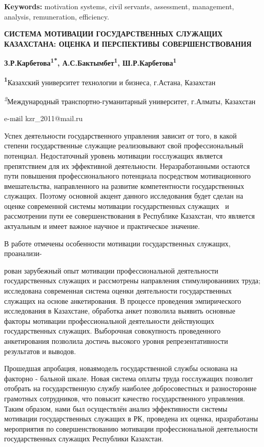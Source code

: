 {\bfseries Keywords:} motivation systems, civil servants, assessment,
management, analysis, remuneration, efficiency.

\begin{center}
{\large\bfseries СИСТЕМА МОТИВАЦИИ ГОСУДАРСТВЕННЫХ СЛУЖАЩИХ КАЗАХСТАНА: ОЦЕНКА И
ПЕРСПЕКТИВЫ СОВЕРШЕНСТВОВАНИЯ}

{\bfseries З.Р.Карбетова\textsuperscript{1*},
А.С.Бактымбет\textsuperscript{1}, Ш.Р.Карбетова\textsuperscript{1}}

{\bfseries \textsuperscript{1}}Казахский университет технологии и бизнеса,
г.Астана, Казахстан

\emph{\textsuperscript{2}}Международный транспортно-гуманитарный
университет, г.Алматы, Казахстан

e-mаil kzr\_2011@mail.ru
\end{center}

Успех деятельности государственного управления зависит от того, в какой
степени государственные служащие реализовывают свой профессиональный
потенциал. Недостаточный уровень мотивации госслужащих является
препятствием для их эффективной деятельности. Неразработанными остаются
пути повышения профессионального потенциала посредством мотивационного
вмешательства, направленного на развитие компетентности государственных
служащих. Поэтому основной акцент данного исследования будет сделан на
оценке современной системы мотивации государственных служащих~ и
рассмотрении пути ее совершенствования в Республике Казахстан, что
является актуальным и имеет важное научное и практическое значение.

В работе отмечены особенности мотивации государственных служащих,
проанализи-

рован зарубежный опыт мотивации профессиональной деятельности
государственных служащих и рассмотрены направления стимулированияих
труда; исследована современная система оценки деятельности
государственных служащих на основе анкетирования. В процессе проведения
эмпирического исследования в Казахстане, обработка анкет позволила
выявить основные факторы мотивации профессиональной деятельности
действующих государственных служащих. Выборочная совокупность
проведенного анкетирования позволила достичь высокого уровня репрезентативности результатов и выводов.

Прошедшая апробация, новаямодель государственной службы основана на
факторно - бальной шкале. Новая система оплаты труда госслужащих
позволит отобрать на государственную службу наиболее добросовестных и
разносторонне грамотных сотрудников, что повысит качество
государственного управления. Таким образом, нами был осуществлён анализ
эффективности системы мотивации государственных служащих в РК, проведена
их оценка, иразработаны мероприятия по совершенствованию мотивации
профессиональной деятельности государственных служащих Республики
Казахстан.

